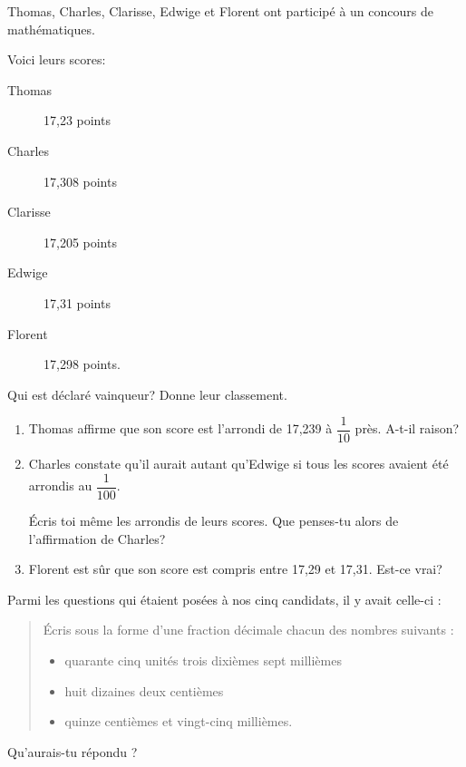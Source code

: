 \begin{myenumerate}
  \item Thomas, Charles, Clarisse, Edwige et Florent ont participé à
    un concours de mathématiques.
\par Voici leurs scores:
\begin{description}
  \item[Thomas] 17,23 points
  \item[Charles] 17,308 points
  \item[Clarisse] 17,205 points
  \item[Edwige] 17,31 points
  \item[Florent] 17,298 points.
\end{description}
Qui est déclaré vainqueur? Donne leur classement.
\item
  \begin{enumerate}
  \item Thomas affirme que son score est l'arrondi de 17,239 à
    $\dfrac1{10}$ près. A-t-il raison?
  \item Charles constate qu'il aurait autant qu'Edwige si tous les
    scores avaient été arrondis au $\dfrac1{100}$.\par\'Ecris toi même
    les arrondis de leurs scores. Que penses-tu alors de l'affirmation
    de Charles?
  \item Florent est sûr que son score est compris entre 17,29 et
    17,31. Est-ce vrai?
  \end{enumerate}
\item Parmi les questions qui étaient posées à nos cinq candidats, il
  y avait celle-ci :
\begin{quote}
  \'Ecris sous la forme d'une fraction décimale chacun des nombres
  suivants :
  \begin{itemize}
  \item quarante cinq unités trois dixièmes sept millièmes
  \item huit dizaines deux centièmes
  \item quinze centièmes et vingt-cinq millièmes.
  \end{itemize}
\end{quote}
Qu'aurais-tu répondu ?
\end{myenumerate}